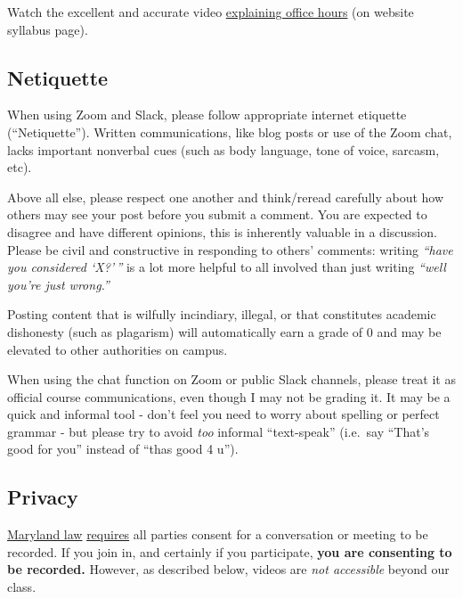 \documentclass{article}
\begin{document}
Watch the excellent and accurate video
\href{https://vimeo.com/270014784}{explaining office hours} (on website
syllabus page).

\hypertarget{netiquette}{%
\subsection*{Netiquette}\label{netiquette}}

When using Zoom and Slack, please follow appropriate internet etiquette
(``Netiquette''). Written communications, like blog posts or use of the
Zoom chat, lacks important nonverbal cues (such as body language, tone
of voice, sarcasm, etc).

Above all else, please respect one another and think/reread carefully
about how others may see your post before you submit a comment. You are
expected to disagree and have different opinions, this is inherently
valuable in a discussion. Please be civil and constructive in responding
to others' comments: writing \emph{``have you considered `X?'\,''} is a
lot more helpful to all involved than just writing \emph{``well you're
just wrong.''}

Posting content that is wilfully incindiary, illegal, or that
constitutes academic dishonesty (such as plagarism) will automatically
earn a grade of 0 and may be elevated to other authorities on campus.

When using the chat function on Zoom or public Slack channels, please
treat it as official course communications, even though I may not be
grading it. It may be a quick and informal tool - don't feel you need to
worry about spelling or perfect grammar - but please try to avoid
\emph{too} informal ``text-speak'' (i.e.~say ``That's good for you''
instead of ``thas good 4 u'').

\hypertarget{privacy}{%
\subsection*{Privacy}\label{privacy}}

\href{https://www.execvision.io/blog/maryland-call-recording-laws/}{Maryland
law}
\href{https://law.justia.com/codes/maryland/2005/gcj/10-402.html}{requires}
all parties consent for a conversation or meeting to be recorded. If you
join in, and certainly if you participate, \textbf{you are consenting to
be recorded.} However, as described below, videos are \emph{not
accessible} beyond our class.
\end{document}
